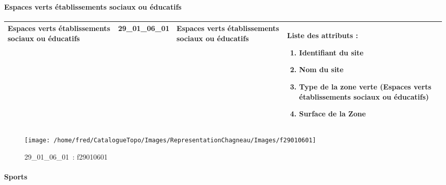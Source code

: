 \documentclass[12pt,titlepage]{book}
\begin{document}
\paragraph{Espaces verts établissements sociaux ou éducatifs}
\noindent
\vspace{\baselineskip}

\renewcommand{\arraystretch}{1.2}
\begin{supertabular}{|p{10cm}|c|p{13cm}|p{12cm}|}
 Espaces verts établissements sociaux ou éducatifs & 29\_01\_06\_01 & Espaces verts établissements sociaux ou éducatifs & Liste des attributs :
\begin{enumerate}
  \item Identifiant du site  \item Nom du site  \item Type de la zone verte (Espaces verts établissements sociaux ou éducatifs)  \item Surface de la Zone\end{enumerate}
\\
\hline
\end{supertabular}
\begin{figure}[h!]
  \hfill         %
  \begin{minipage}[t]{3cm}
    \begin{center}
      \texttt{[image: /home/fred/CatalogueTopo/Images/RepresentationChagneau/Images/f29010601]}
      \caption[~29\_01\_06\_01]{\small{29\_01\_06\_01~:} \tiny{f29010601}}\label{f29010601}
    \end{center}
  \end{minipage}
\end{figure}


\paragraph{Sports}
\noindent
\vspace{\baselineskip}
\end{document}

